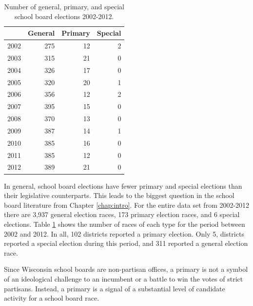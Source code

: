 \begin{table}[ht]
\centering
\begin{tabular}{rrrr}
  \hline
 & General & Primary & Special \\ 
  \hline
2002 & 275 &  12 &   2 \\ 
  2003 & 315 &  21 &   0 \\ 
  2004 & 326 &  17 &   0 \\ 
  2005 & 320 &  20 &   1 \\ 
  2006 & 356 &  12 &   2 \\ 
  2007 & 395 &  15 &   0 \\ 
  2008 & 370 &  13 &   0 \\ 
  2009 & 387 &  14 &   1 \\ 
  2010 & 385 &  16 &   0 \\ 
  2011 & 385 &  12 &   0 \\ 
  2012 & 389 &  21 &   0 \\ 
   \hline
\end{tabular}
\caption{Number of general, primary, and special school board elections 2002-2012.} 
\label{tab:electype}
\end{table}


In general, school board elections have fewer primary and special elections than 
their legislative counterparts. This leads to the biggest question in the school 
board literature from Chapter \ref{chap:intro}. For the entire data set from 2002-2012 there are 3,937 
general election races, 173 
primary election races, and 6
special elections. Table \ref{tab:electype} shows the number of races of each type 
for the period between 2002 and 2012. In all, 102 districts 
reported a primary election. Only 
5, 
districts reported a special election during this period, and 311 
reported a general election race. 

Since Wisconsin school boards are non-partisan offices, a primary is not a symbol of 
an ideological challenge to an incumbent or a battle to win the votes of 
strict partisans. Instead, a primary is a signal of a substantial level of candidate 
activity for a school board race. 

